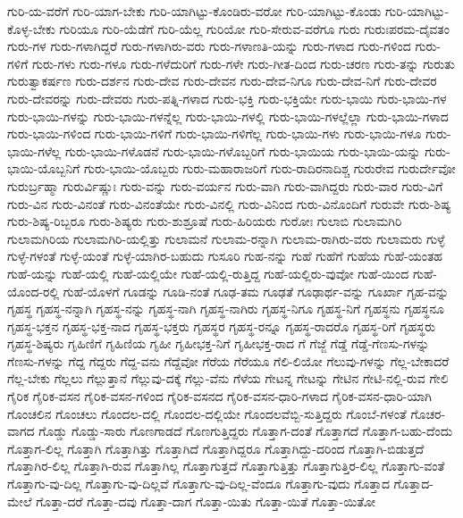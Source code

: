 {ಗುರಿ-ಯ-ವರೆಗೆ
ಗುರಿ-ಯಾಗ-ಬೇಕು
ಗುರಿ-ಯಾಗಿಟ್ಟು-ಕೊಂಡಿರು-ವರೋ
ಗುರಿ-ಯಾಗಿಟ್ಟು-ಕೊಂಡು
ಗುರಿ-ಯಾಗಿಟ್ಟು-ಕೊಳ್ಳ-ಬೇಕು
ಗುರಿಯೂ
ಗುರಿ-ಯೆಡೆಗೆ
ಗುರಿ-ಯೆಲ್ಲ
ಗುರಿಯೋ
ಗುರಿ-ಸೇರುವ-ವರೆಗೂ
ಗುರು
ಗುರುಃಪರಮ-ದೈವತಂ
ಗುರು-ಗಳ
ಗುರು-ಗಳಾಗಿದ್ದರೆ
ಗುರು-ಗಳಾಗಿರು-ವರು
ಗುರು-ಗಳಾಣತಿ-ಯನ್ನು
ಗುರು-ಗಳಾದ
ಗುರು-ಗಳಿಂದ
ಗುರು-ಗಳಿಗೆ
ಗುರು-ಗಳು
ಗುರು-ಗಳೂ
ಗುರು-ಗಳೆದುರಿಗೆ
ಗುರು-ಗಳೇ
ಗುರು-ಗೀತ-ದಿಂದ
ಗುರು-ಚರಣ
ಗುರು-ತನ್ನು
ಗುರುತು
ಗುರುತ್ವಾಕರ್ಷಣ
ಗುರು-ದರ್ಶನ
ಗುರು-ದೇವ
ಗುರು-ದೇವನ
ಗುರು-ದೇವ-ನಿಗೂ
ಗುರು-ದೇವ-ನಿಗೆ
ಗುರು-ದೇವರ
ಗುರು-ದೇವರನ್ನು
ಗುರು-ದೇವರು
ಗುರು-ಪತ್ನಿ-ಗಳಾದ
ಗುರು-ಭಕ್ತಿ
ಗುರು-ಭಕ್ತಿಯೇ
ಗುರು-ಭಾಯಿ
ಗುರು-ಭಾಯಿ-ಗಳ
ಗುರು-ಭಾಯಿ-ಗಳನ್ನು
ಗುರು-ಭಾಯಿ-ಗಳನ್ನೆಲ್ಲ
ಗುರು-ಭಾಯಿ-ಗಳಲ್ಲಿ
ಗುರು-ಭಾಯಿ-ಗಳಲ್ಲೆಲ್ಲಾ
ಗುರು-ಭಾಯಿ-ಗಳಾದ
ಗುರು-ಭಾಯಿ-ಗಳಿಂದ
ಗುರು-ಭಾಯಿ-ಗಳಿಗೆ
ಗುರು-ಭಾಯಿ-ಗಳಿಗೆಲ್ಲ
ಗುರು-ಭಾಯಿ-ಗಳು
ಗುರು-ಭಾಯಿ-ಗಳೂ
ಗುರು-ಭಾಯಿ-ಗಳೆಲ್ಲ
ಗುರು-ಭಾಯಿ-ಗಳೊಡನೆ
ಗುರು-ಭಾಯಿ-ಗಳೊಬ್ಬರಿಗೆ
ಗುರು-ಭಾಯಿಯ
ಗುರು-ಭಾಯಿ-ಯನ್ನು
ಗುರು-ಭಾಯಿ-ಯೊಬ್ಬನಿಗೆ
ಗುರು-ಭಾಯಿ-ಯೊಬ್ಬರು
ಗುರು-ಮಹಾರಾಜರಿಗೆ
ಗುರು-ರಾದಿರನಾದಿಶ್ಚ
ಗುರುರೇವ
ಗುರುರ್ದೇವೋ
ಗುರುರ್ಬ್ರಹ್ಮಾ
ಗುರುರ್ವಿಷ್ಣುಃ
ಗುರು-ವನ್ನು
ಗುರು-ವರ್ಯನ
ಗುರು-ವಾಗಿ
ಗುರು-ವಾಗಿದ್ದರು
ಗುರು-ವಾರ
ಗುರು-ವಿಗೆ
ಗುರು-ವಿನ
ಗುರು-ವಿನಂತೆ
ಗುರು-ವಿನಂತೆಯೇ
ಗುರು-ವಿನಲ್ಲಿ
ಗುರು-ವಿನಿಂದ
ಗುರು-ವಿನೊಂದಿಗೆ
ಗುರುವೇ
ಗುರು-ಶಿಷ್ಯ
ಗುರು-ಶಿಷ್ಯ-ರಿಬ್ಬರೂ
ಗುರು-ಶಿಷ್ಯರು
ಗುರು-ಶುಶ್ರೂಷೆ
ಗುರು-ಹಿರಿಯರು
ಗುರೋಃ
ಗುಲಾಬಿ
ಗುಲಾಮಗಿರಿ
ಗುಲಾಮಗಿರಿಯ
ಗುಲಾಮಗಿರಿ-ಯಲ್ಲಿತ್ತು
ಗುಲಾಮನೆ
ಗುಲಾಮ-ರನ್ನಾಗಿ
ಗುಲಾಮ-ರಾಗಿರು-ವರು
ಗುಲಾಮರು
ಗುಳ್ಳೆ
ಗುಳ್ಳೆ-ಗಳಂತೆ
ಗುಳ್ಳೆ-ಯಂತೆ
ಗುಳ್ಳೆ-ಯಾಗಿರ-ಬಹುದು
ಗುಸೂರಿ
ಗುಹ-ನನ್ನು
ಗುಹೆ
ಗುಹೆಗೆ
ಗುಹೆಯ
ಗುಹೆ-ಯಂತಹ
ಗುಹೆ-ಯನ್ನು
ಗುಹೆ-ಯಲ್ಲಿ
ಗುಹೆ-ಯಲ್ಲಿಯೇ
ಗುಹೆ-ಯಲ್ಲಿ-ರುತ್ತಿದ್ದ
ಗುಹೆ-ಯಲ್ಲಿರು-ವುವೋ
ಗುಹೆ-ಯಿಂದ
ಗುಹೆ-ಯೊಂದ-ರಲ್ಲಿ
ಗುಹೆ-ಯೊಳಗೆ
ಗೂಡನ್ನು
ಗೂಡಿ-ನಂತೆ
ಗೂಢ-ತಮ
ಗೂಢತೆ
ಗೂಢಾರ್ಥ-ವನ್ನು
ಗೂರ್ಖಾ
ಗೃಹ-ವನ್ನು
ಗೃಹಸ್ಥ
ಗೃಹಸ್ಥ-ನನ್ನಾಗಿ
ಗೃಹಸ್ಥ-ನನ್ನು
ಗೃಹಸ್ಥ-ನಾಗಿ
ಗೃಹಸ್ಥ-ನಾಗಿರು
ಗೃಹಸ್ಥ-ನಿಗೂ
ಗೃಹಸ್ಥ-ನಿಗೆ
ಗೃಹಸ್ಥನು
ಗೃಹಸ್ಥನೂ
ಗೃಹಸ್ಥ-ಭಕ್ತನ
ಗೃಹಸ್ಥ-ಭಕ್ತ-ನಾದ
ಗೃಹಸ್ಥ-ಭಕ್ತರು
ಗೃಹಸ್ಥರ
ಗೃಹಸ್ಥ-ರನ್ನೂ
ಗೃಹಸ್ಥ-ರಾದರೊ
ಗೃಹಸ್ಥ-ರಿಗೆ
ಗೃಹಸ್ಥರು
ಗೃಹಸ್ಥ-ಶಿಷ್ಯರು
ಗೃಹಿಣಿಗೆ
ಗೃಹಿಣಿಯ
ಗೃಹೀ
ಗೃಹೀಭಕ್ತ-ನಿಗೆ
ಗೃಹೀಭಕ್ತ-ರಾದ
ಗೆ
ಗೆಜ್ಜೆ
ಗೆಡ್ಡೆ
ಗೆಡ್ಡೆ-ಗೆಣಸು-ಗಳನ್ನು
ಗೆಣಸು-ಗಳನ್ನು
ಗೆದ್ದ
ಗೆದ್ದರು
ಗೆದ್ದ-ವನು
ಗೆದ್ದೆವೋ
ಗೆರೆಯ
ಗೆರೆಯೂ
ಗೆಲಿ-ಲಿಯೋ
ಗೆಲುವು-ಗಳನ್ನು
ಗೆಲ್ಲ-ಬೇಕಾದರೆ
ಗೆಲ್ಲ-ಬೇಕು
ಗೆಲ್ಲಲು
ಗೆಲ್ಲುತ್ತಾನೆ
ಗೆಲ್ಲುವು-ದಕ್ಕೆ
ಗೆಲ್ಲು-ವೆನು
ಗೆಳೆಯ
ಗೇಟನ್ನ
ಗೇಟನ್ನು
ಗೇಟಿನ
ಗೇಟಿ-ನಲ್ಲಿ-ರುವ
ಗೇಲಿ
ಗೈರಿಕ
ಗೈರಿಕ-ವಸನ
ಗೈರಿಕ-ವಸನ-ಗಳಿಂದ
ಗೈರಿಕ-ವಸನದ
ಗೈರಿಕ-ವಸನ-ಧಾರಿ-ಗಳಾದ
ಗೈರಿಕ-ವಸನ-ಧಾರಿ-ಯಾಗಿ
ಗೊಂಚಲಿನ
ಗೊಂಚಲು
ಗೊಂದಲ-ದಲ್ಲಿ
ಗೊಂದಲ-ದಲ್ಲಿಯೇ
ಗೊಂದಲವೆಬ್ಬಿ-ಸುತ್ತಿದ್ದರು
ಗೊಂಬೆ-ಗಳಂತೆ
ಗೊಚರ-ವಾಗದ
ಗೊಡ್ಡು
ಗೊಡ್ಡು-ಸಾರು
ಗೊಣಗಾಡದೆ
ಗೊಣಗುತ್ತಿದ್ದರು
ಗೊತ್ತಾಗ-ದಂತೆ
ಗೊತ್ತಾಗದೆ
ಗೊತ್ತಾಗ-ಬಹು-ದೆಂದು
ಗೊತ್ತಾಗ-ಲಿಲ್ಲ
ಗೊತ್ತಾಗಿ
ಗೊತ್ತಾಗಿತ್ತು
ಗೊತ್ತಾಗಿದೆ
ಗೊತ್ತಾಗಿದ್ದರೂ
ಗೊತ್ತಾಗಿದ್ದು-ದರಿಂದ
ಗೊತ್ತಾಗಿ-ಬಿಡುತ್ತದೆ
ಗೊತ್ತಾಗಿರ-ಲಿಲ್ಲ
ಗೊತ್ತಾಗಿ-ರುವ
ಗೊತ್ತಾಗಿಲ್ಲ
ಗೊತ್ತಾಗುತ್ತದೆ
ಗೊತ್ತಾಗುತ್ತಿತ್ತು
ಗೊತ್ತಾಗುತ್ತಿರ-ಲಿಲ್ಲ
ಗೊತ್ತಾಗು-ವಂತೆ
ಗೊತ್ತಾಗು-ವು-ದಿಲ್ಲ
ಗೊತ್ತಾಗು-ವು-ದಿಲ್ಲವೆ
ಗೊತ್ತಾಗು-ವು-ದಿಲ್ಲ-ವೆಂದೂ
ಗೊತ್ತಾಗು-ವುದು
ಗೊತ್ತಾದ
ಗೊತ್ತಾದ-ಮೇಲೆ
ಗೊತ್ತಾ-ದರೆ
ಗೊತ್ತಾ-ದವು
ಗೊತ್ತಾ-ದಾಗ
ಗೊತ್ತಾ-ಯಿತು
ಗೊತ್ತಾ-ಯಿತೆ
ಗೊತ್ತಾ-ಯಿತೋ
}
